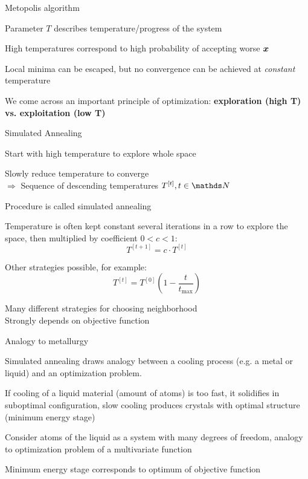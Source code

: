 \documentclass[11pt,compress,t,notes=noshow, xcolor=table]{beamer}
\begin{document}
\begin{framei}{Metopolis algorithm}
\item Parameter $T$ describes temperature/progress of the system
\item High temperatures correspond to high probability of accepting worse $\bm{x}$
\item Local minima can be escaped, but no convergence can be achieved at \textit{constant} temperature
\item We come across an important principle of optimization: \textbf{exploration (high T) vs. exploitation (low T)}
\spacer
{}
\end{framei}


\begin{framei}{Simulated Annealing}
\item Start with high temperature to explore whole space
\item Slowly reduce temperature to converge \\
$\Rightarrow$ Sequence of descending temperatures $T^{[t]}, t \in \N$
\item Procedure is called simulated annealing
\item Temperature is often kept constant several iterations in a row to explore the space, then multiplied by coefficient $0<c<1$: 
$$T^{[t+1]} = c \cdot T^{[t]}$$
\item Other strategies possible, for example: 
$$T^{[t]} = T^{[0]} \left( 1 - \frac{t}{t_{\text{max}}} \right)$$
\item Many different strategies for choosing neighborhood\\
Strongly depends on objective function
\end{framei}


\begin{framei}[fs=normalsize,sep=L]{Analogy to metallurgy}
\item Simulated annealing draws analogy between a cooling process (e.g. a metal or liquid) and an optimization problem.
\item If cooling of a liquid material (amount of atoms) is too fast, it solidifies in suboptimal configuration, slow cooling produces crystals with optimal structure (minimum energy stage)
\item Consider atoms of the liquid as a system with many degrees of freedom, analogy to optimization problem of a multivariate function
\item Minimum energy stage corresponds to optimum of objective function
\end{framei}

\endlecture
\end{document}
